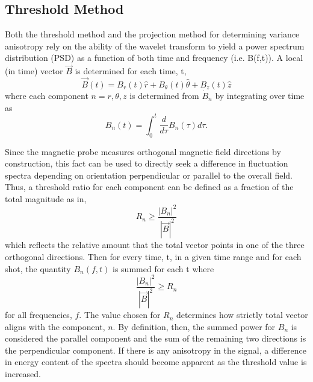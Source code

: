 \documentclass[aip,prl,amsmath,amssymb,reprint,superscriptaddress]{revtex4-1} %
\begin{document}
\subsection{Threshold Method}

Both the threshold method and the projection method for determining variance anisotropy rely on the ability of the wavelet transform to yield a power spectrum distribution (PSD) as a function of both time and frequency (i.e. B(f,t)). A local (in time) vector $\vec{B}$ is determined for each time, t,
\begin{equation}
\vec{B}(t) = B_{r}(t)\hat{r} + B_{\theta}(t)\hat{\theta} + B_{z}(t)\hat{z}
\label{eq:Bvector}
\end{equation}
where each component $n=r,\theta,z$ is determined from $\dot{B}_{n}$ by integrating over time as
\begin{equation}
B_{n}(t) = \int_{0}^{t} \frac{d}{d\tau}B_{n}(\tau)d\tau.
\label{eq:Bintegrated}
\end{equation}

Since the magnetic probe measures orthogonal magnetic field directions by construction, this fact can be used to directly seek a difference in fluctuation spectra depending on orientation perpendicular or parallel to the overall field. Thus, a threshold ratio for each component can be defined as a fraction of the total magnitude as in,
\begin{equation}
R_{n} \geq \frac{|B_{n}|^{2}}{|\vec{B}|^{2}}
\label{eq:Bthreshold}
\end{equation}
which reflects the relative amount that the total vector points in one of the three orthogonal directions. Then for every time, t, in a given time range and for each shot, the quantity $B_{n}(f,t)$ is summed for each t where
\begin{equation}
\frac{|B_{n}|^{2}}{|\vec{B}|^{2}} \geq R_{n}
\label{eq:Bcondition}
\end{equation}
for all frequencies, $f$. The value chosen for $R_{n}$ determines how strictly total vector aligns with the component, $n$. By definition, then, the summed power for $B_{n}$ is considered the parallel component and the sum of the remaining two directions is the perpendicular component. If there is any anisotropy in the signal, a difference in energy content of the spectra should become apparent as the threshold value is increased.
\end{document}
